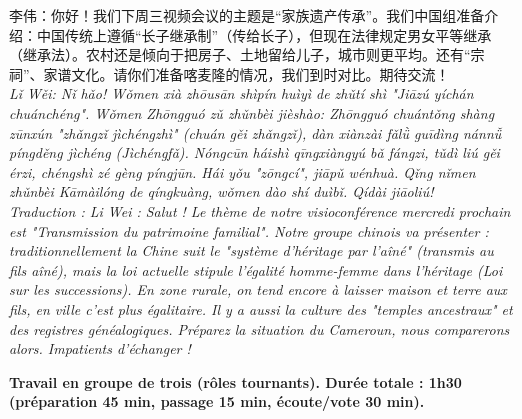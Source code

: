 \documentclass[11pt]{article}
\newcounter{popsec}
\newcounter{popsub}
\newcommand{\courssub}[1]{%
  \stepcounter{popsub}%
  \par\vspace{9pt}\noindent{\popxbold\fontsize{11.5}{13}\selectfont\color{popink}{\color{poporange}\thepopsec.\thepopsub}\hspace{6pt}#1}\par\nopagebreak\vspace{4pt}
}
\begin{document}
\begin{textebox}
李伟：你好！我们下周三视频会议的主题是“家族遗产传承”。我们中国组准备介绍：中国传统上遵循“长子继承制”（传给长子），但现在法律规定男女平等继承（继承法）。农村还是倾向于把房子、土地留给儿子，城市则更平均。还有“宗祠”、家谱文化。请你们准备喀麦隆的情况，我们到时对比。期待交流！
\\ \textit{Lǐ Wěi: Nǐ hǎo! Wǒmen xià zhōusān shìpín huìyì de zhǔtí shì "Jiāzú yíchán chuánchéng". Wǒmen Zhōngguó zǔ zhǔnbèi jièshào: Zhōngguó chuántǒng shàng zūnxún "zhǎngzǐ jìchéngzhì" (chuán gěi zhǎngzǐ), dàn xiànzài fǎlǜ guīdìng nánnǚ píngděng jìchéng (Jìchéngfǎ). Nóngcūn háishì qīngxiàngyú bǎ fángzi, tǔdì liú gěi érzi, chéngshì zé gèng píngjūn. Hái yǒu "zōngcí", jiāpǔ wénhuà. Qǐng nǐmen zhǔnbèi Kāmàilóng de qíngkuàng, wǒmen dào shí duìbǐ. Qídài jiāoliú!}
\\ \textit{Traduction : Li Wei : Salut ! Le thème de notre visioconférence mercredi prochain est "Transmission du patrimoine familial". Notre groupe chinois va présenter : traditionnellement la Chine suit le "système d'héritage par l'aîné" (transmis au fils aîné), mais la loi actuelle stipule l'égalité homme-femme dans l'héritage (Loi sur les successions). En zone rurale, on tend encore à laisser maison et terre aux fils, en ville c'est plus égalitaire. Il y a aussi la culture des "temples ancestraux" et des registres généalogiques. Préparez la situation du Cameroun, nous comparerons alors. Impatients d'échanger !}
\end{textebox}

\courssub{Consignes}
\noindent \textbf{Travail en groupe de trois (rôles tournants). Durée totale : 1h30 (préparation 45 min, passage 15 min, écoute/vote 30 min).}
\end{document}
